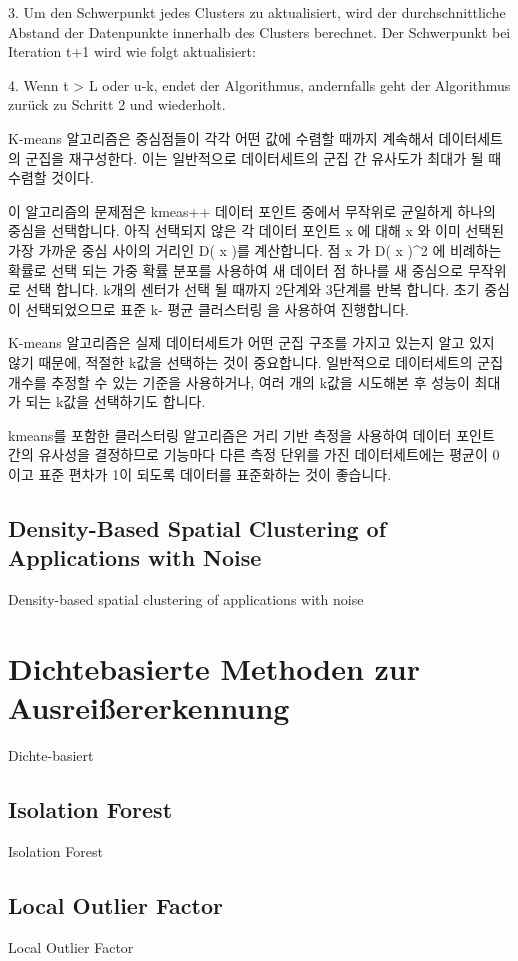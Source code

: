                     3. Um den Schwerpunkt jedes Clusters zu aktualisiert, wird der durchschnittliche Abstand der Datenpunkte innerhalb des Clusters berechnet. Der Schwerpunkt bei Iteration t+1 wird wie folgt aktualisiert:

                    4. Wenn t > L oder u-k, endet der Algorithmus, andernfalls geht der Algorithmus zurück zu Schritt 2 und wiederholt.
                

                K-means 알고리즘은 중심점들이 각각 어떤 값에 수렴할 때까지 계속해서 데이터세트의 군집을 재구성한다. 이는 일반적으로 데이터세트의 군집 간 유사도가 최대가 될 때 수렴할 것이다.

                이 알고리즘의 문제점은
                kmeas++
                데이터 포인트 중에서 무작위로 균일하게 하나의 중심을 선택합니다.
                아직 선택되지 않은 각 데이터 포인트 x 에 대해 x 와 이미 선택된 가장 가까운 중심 사이의 거리인 D( x )를 계산합니다.
                점 x 가 D( x )^2 에 비례하는 확률로 선택 되는 가중 확률 분포를 사용하여 새 데이터 점 하나를 새 중심으로 무작위로 선택 합니다.
                k개의 센터가 선택 될 때까지 2단계와 3단계를 반복 합니다.
                초기 중심이 선택되었으므로 표준 k- 평균 클러스터링 을 사용하여 진행합니다.

                K-means 알고리즘은 실제 데이터세트가 어떤 군집 구조를 가지고 있는지 알고 있지 않기 때문에, 적절한 k값을 선택하는 것이 중요합니다. 일반적으로 데이터세트의 군집 개수를 추정할 수 있는 기준을 사용하거나, 여러 개의 k값을 시도해본 후 성능이 최대가 되는 k값을 선택하기도 합니다.
                

                kmeans를 포함한 클러스터링 알고리즘은 거리 기반 측정을 사용하여 데이터 포인트 간의 유사성을 결정하므로 기능마다 다른 측정 단위를 가진 데이터세트에는 평균이 0이고 표준 편차가 1이 되도록 데이터를 표준화하는 것이 좋습니다.
                
            \subsection{Density-Based Spatial Clustering of Applications with Noise}
                Density-based spatial clustering of applications with noise
                
        \section{Dichtebasierte Methoden zur Ausreißererkennung}
            Dichte-basiert
            
            \subsection{Isolation Forest}
                Isolation Forest
                
            \subsection{Local Outlier Factor}
                Local Outlier Factor
